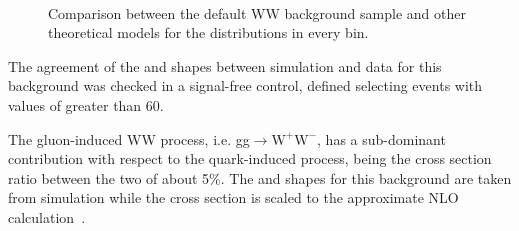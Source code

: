\begin{figure}[htb]
\\
\caption{Comparison between the default WW background sample and other theoretical models for the \mt distributions in every \pth bin.\label{fig:ww_mth}}
\end{figure}

The agreement of the \mll and \mt shapes between simulation and data for this background was checked in a signal-free control, defined selecting events with values of \mll greater than 60\GeV.

The gluon-induced WW process, i.e. gg$\to \mathrm{W^{+}W^{-}}$, has a sub-dominant contribution with respect to the quark-induced process, being the cross section ratio between the two of about 5\%. The \mll and \mt shapes for this background are taken from simulation while the cross section is scaled to the approximate NLO calculation~\cite{Bonvini:2013jha,Passarino:2013bha}.













































